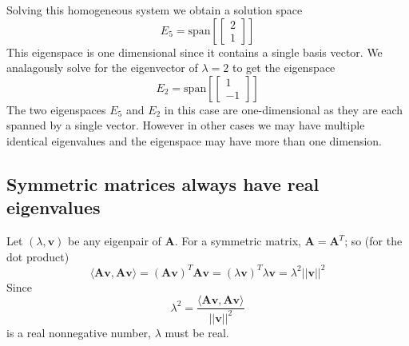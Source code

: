 \documentclass{report}
\begin{document}
Solving this homogeneous system we obtain a solution space
\begin{equation*}
E_5=\text{span}[\begin{bmatrix}2\\1\end{bmatrix}]
\end{equation*}
This eigenspace is one dimensional since it contains a single basis vector. We analagously solve for 
the eigenvector of $\lambda=2$ to get the eigenspace
\begin{equation*}
E_2=\text{span}[\begin{bmatrix}1\\-1\end{bmatrix}]
\end{equation*}
The two eigenspaces $E_5$ and $E_2$ in this case are one-dimensional as they are each spanned by a single vector. 
However in other cases we may have multiple identical eigenvalues and the eigenspace may have more than one 
dimension.
\newpage

\subsection{Symmetric matrices always have real eigenvalues} %
\label{matrix dec:smahre}
Let $(\lambda,\bm{v})$ be any eigenpair of $\bm{A}$. For a symmetric matrix, $\bm{A}=\bm{A}^T$; so
(for the dot product)
\begin{equation*}
\langle\bm{Av},\bm{Av}\rangle=(\bm{Av})^T\bm{Av}
=(\lambda\bm{v})^T\lambda\bm{v}=\lambda^2||\bm{v}||^2
\end{equation*}
Since
\begin{equation*}
\lambda^2=\frac{\langle\bm{Av},\bm{Av}\rangle}{||\bm{v}||^2}
\end{equation*}
is a real nonnegative number, $\lambda$ must be real.
\newpage
\end{document}
